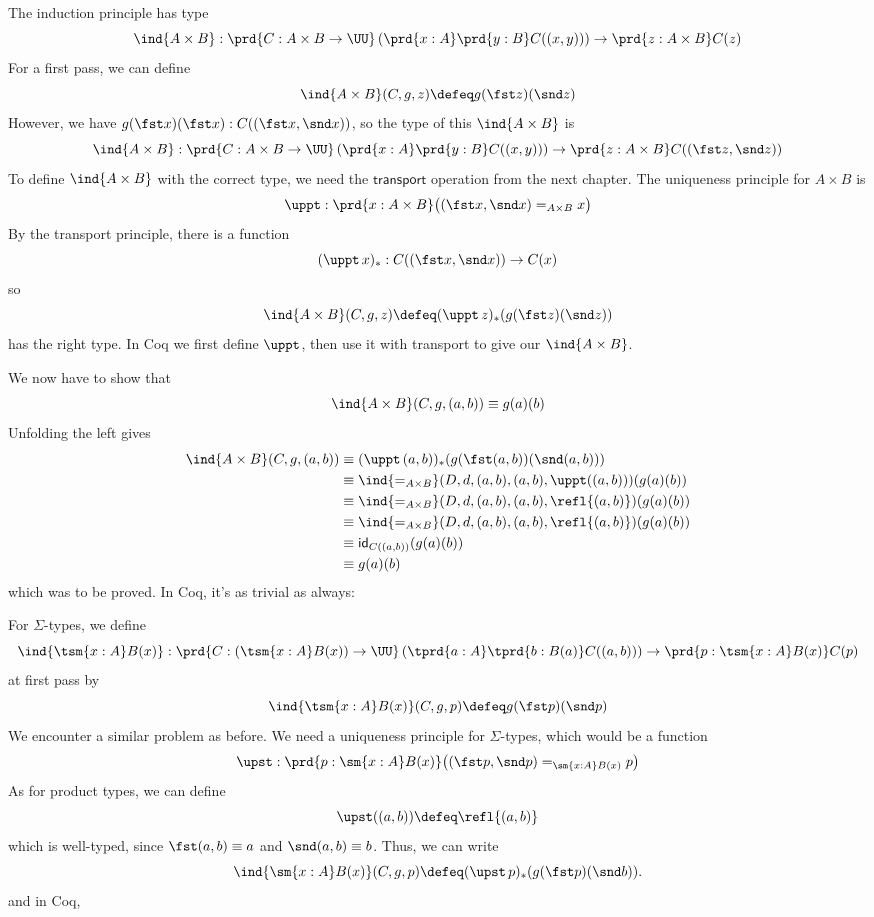 \soln The induction principle has type
\[
  \ind{A\times B} : \prd{C: A\times B \to \UU}\left(\prd{x:A}\prd{y:B}C((x,
    y))\right) \to \prd{z:A\times B}C(z)
\]
For a first pass, we can define
\[
  \ind{A\times B}(C, g, z)
  \defeq
  g(\fst z)(\snd z)
\]
However, we have $g(\fst x)(\fst x) : C((\fst x, \snd x))$, so the type of this
$\ind{A \times B}$ is
\[
  \ind{A\times B} : \prd{C: A\times B \to \UU}\left(\prd{x:A}\prd{y:B}C((x,
    y))\right) \to \prd{z:A\times B}C((\fst z, \snd z))
\]
To define $\ind{A \times B}$ with the correct type, we need the
$\mathsf{transport}$ operation from the next chapter.  The uniqueness principle
for $A \times B$ is
\[
  \uppt : \prd{x : A \times B} \big((\fst x, \snd x) =_{A \times B} x\big)
\]
By the transport principle, there is a function
\[
  (\uppt\, x)_{*} : C((\fst x, \snd x)) \to C(x)
\]
so
\[
  \ind{A \times B}(C, g, z)
  \defeq
  (\uppt\, z)_{*}(g(\fst z)(\snd z))
\]
has the right type.
In Coq we first define $\uppt$, then use it with transport to give our
$\ind{A\times B}$.

We now have to show that
\[
  \ind{A \times B}(C, g, (a, b)) 
  \equiv g(a)(b)
\]
Unfolding the left gives
\begin{align*}
  \ind{A \times B}(C, g, (a, b)) 
  &\equiv
  (\uppt\, (a, b))_{*}(g(\fst (a, b))(\snd (a, b)))
  \\&\equiv
  \ind{=_{A \times B}}(D, d, (a, b), (a, b), \uppt((a, b)))(g(a)(b))
  \\&\equiv
  \ind{=_{A \times B}}(D, d, (a, b), (a, b), \refl{(a, b)})
  (g(a)(b))
  \\&\equiv
  \ind{=_{A \times B}}(D, d, (a, b), (a, b), \refl{(a, b)})
  (g(a)(b))
  \\&\equiv
  \mathsf{id}_{C((a, b))}(g(a)(b))
  \\&\equiv
  g(a)(b)
\end{align*}
which was to be proved.  In Coq, it's as trivial as always:

For $\Sigma$-types, we define
\[
  \ind{\tsm{x:A}B(x)} : \prd{C:(\tsm{x:A}B(x)) \to \UU}
  \left(\tprd{a:A}\tprd{b:B(a)}C((a, b))\right) \to \prd{p: \tsm{x:A}B(x)}C(p)
\]
at first pass by
\[
  \ind{\tsm{x:A}B(x)}(C, g, p)
  \defeq
  g(\fst p)(\snd p)
\]
We encounter a similar problem as before.  We need a uniqueness principle for
$\Sigma$-types, which would be a function
\[
  \upst : \prd{p : \sm{x:A}B(x)} \big(
    (\fst p, \snd p) =_{\sm{x:A}B(x)} p
  \big)
\]
As for product types, we can define
\[
  \upst((a, b)) \defeq \refl{(a, b)}
\]
which is well-typed, since $\fst(a, b) \equiv a$ and $\snd(a, b) \equiv b$.
Thus, we can write
\[
  \ind{\sm{x:A}B(x)}(C, g, p) \defeq (\upst\, p)_{*}(g(\fst p)(\snd b)).
\]
and in Coq,

